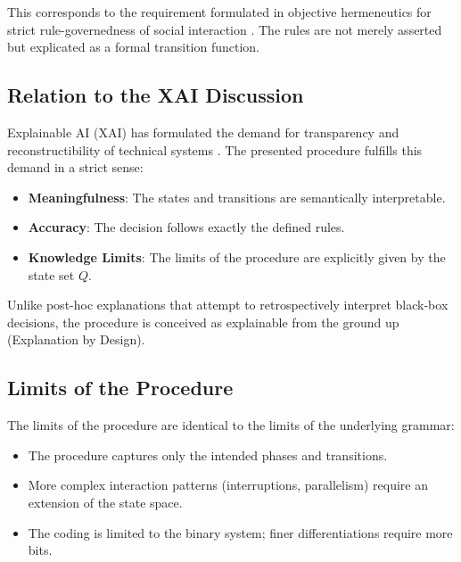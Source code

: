 \documentclass[
  12pt,
  a4paper,
  oneside,
  titlepage
]{article}
\begin{document}
This corresponds to the requirement formulated in objective hermeneutics for 
strict rule-governedness of social interaction \citep[ p.~372]{Oevermann1979}. 
The rules are not merely asserted but explicated as a formal transition 
function.

\subsection{Relation to the XAI Discussion}

Explainable AI (XAI) has formulated the demand for transparency and 
reconstructibility of technical systems \citep{Samek2019, BarredoArrieta2020}. 
The presented procedure fulfills this demand in a strict sense:

\begin{itemize}
    \item \textbf{Meaningfulness}: The states and transitions are semantically 
    interpretable.
    
    \item \textbf{Accuracy}: The decision follows exactly the defined rules.
    
    \item \textbf{Knowledge Limits}: The limits of the procedure are explicitly 
    given by the state set \(Q\).
\end{itemize}

Unlike post-hoc explanations that attempt to retrospectively interpret 
black-box decisions, the procedure is conceived as explainable from the ground 
up (Explanation by Design).

\subsection{Limits of the Procedure}

The limits of the procedure are identical to the limits of the underlying 
grammar:

\begin{itemize}
    \item The procedure captures only the intended phases and transitions.
    
    \item More complex interaction patterns (interruptions, parallelism) 
    require an extension of the state space.
    
    \item The coding is limited to the binary system; finer differentiations 
    require more bits.
\end{itemize}
\end{document}
